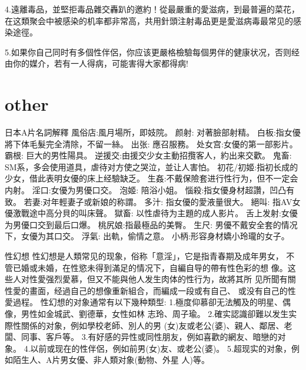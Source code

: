 \documentclass[12pt,UTF8]{ctexbook}
\begin{document}
4.遠離毒品，並堅拒毒品雜交轟趴的邀約！從最嚴重的愛滋病，到最普遍的菜花，在这類聚会中被感染的机率都非常高，共用針頭注射毒品更是愛滋病毒最常见的感染途徑。

5.如果你自己同时有多個性伴侶，你应该更嚴格檢驗每個男伴的健康状况，否则经由你的媒介，若有一人得病，可能害得大家都得病!

\part{other}

日本A片名詞解釋
風俗店:風月場所，即妓院。
颜射: 对著臉部射精。
白板:指女優將下体毛髮完全清除，不留一絲。
出张: 應召服務。
处女宫:女優的第一部影片。
霸根: 巨大的男性陽具。
逆援交:由援交少女主動招攬客人，約出来交歡。
鬼畜: SM系，多会使用道具，虐待对方使之哭泣，並让人害怕。
初花/初姬:指初长成的少女，借此表明女優的床上经驗缺乏。
生姦:不戴保險套进行性行为，但不一定会内射。
淫口:女優为男優口交。
泡姬: 陪浴小姐。
惱殺:指女優身材超讚，凹凸有致。
若妻:对年輕妻子或新娘的称謂。
多汁: 指女優的愛液量很大。
絕叫: 指AV女優激戰途中高分貝的叫床聲。
獄畜: 以性虐待为主題的成人影片。
舌上发射:女優为男優口交到最后口爆。
桃尻娘:指最極品的美臀。
生尺: 男優不戴安全套的情况下，女優为其口交。
浮氣: 出軌，偷情之意。
小柄:形容身材嬌小玲瓏的女子。

性幻想
性幻想是人類常见的现象，俗称「意淫」，它是指青春期及成年男女，
不管已婚或未婚，在性慾未得到滿足的情况下，自編自导的帶有性色彩的想
像。这些人对性愛强烈愛慕，但又不能與他人发生肉体的性行为，故將其所
见所聞有關性愛的畫面，经過自己的想像重新組合，而編成一段或有自己、
或没有自己的性愛過程。
性幻想的对象通常有以下幾种類型:
1.極度仰慕卻无法觸及的明星、偶像，男性如金城武、劉德華，女性如林
志玲、周子瑜。
2.確实認識卻難以发生实際性關係的对象，例如學校老師、別人的男
(女)友或老公(婆)、親人、鄰居、老闆、同事、客戶等。
3.有好感的异性或同性朋友，例如喜歡的網友、暗戀的对象。
4.以前或现在的性伴侶，例如前男(女)友、或老公(婆)。
5.超现实的对象，例如陌生人、A片男女優、非人類对象(動物、外星
人)等。
\end{document}
